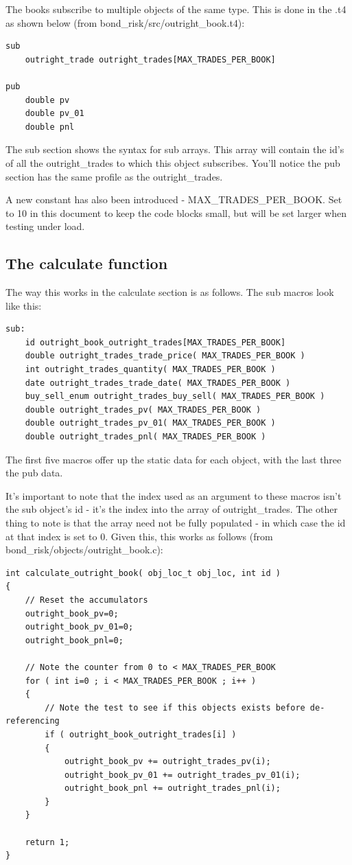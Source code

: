 \documentclass{report}
\begin{document}
The books subscribe to multiple objects of the same type. This is done in the .t4 as shown below (from bond_risk/src/outright_book.t4):

\begin{verbatim}
sub
    outright_trade outright_trades[MAX_TRADES_PER_BOOK]

pub
    double pv
    double pv_01
    double pnl
\end{verbatim}

The sub section shows the syntax for sub arrays. This array will contain the id's of all the outright_trades to which this object subscribes. You'll notice the pub section has the same profile as the outright_trades.

A new constant has also been introduced - MAX_TRADES_PER_BOOK. Set to 10 in this document to keep the code blocks small, but will be set larger when testing under load.

\subsection{The calculate function}

The way this works in the calculate section is as follows. The sub macros look like this:

\begin{verbatim}
sub:
    id outright_book_outright_trades[MAX_TRADES_PER_BOOK]
    double outright_trades_trade_price( MAX_TRADES_PER_BOOK )
    int outright_trades_quantity( MAX_TRADES_PER_BOOK )
    date outright_trades_trade_date( MAX_TRADES_PER_BOOK )
    buy_sell_enum outright_trades_buy_sell( MAX_TRADES_PER_BOOK )
    double outright_trades_pv( MAX_TRADES_PER_BOOK )
    double outright_trades_pv_01( MAX_TRADES_PER_BOOK )
    double outright_trades_pnl( MAX_TRADES_PER_BOOK )
\end{verbatim}

The first five macros offer up the static data for each object, with the last three the pub data.

It's important to note that the index used as an argument to these macros isn't the sub object's id - it's the index into the array of outright_trades. The other thing to note is that the array need not be fully populated - in which case the id at that index is set to 0. Given this, this works as follows (from bond_risk/objects/outright_book.c):

\begin{verbatim}
int calculate_outright_book( obj_loc_t obj_loc, int id )
{
    // Reset the accumulators
    outright_book_pv=0;
    outright_book_pv_01=0;
    outright_book_pnl=0;

    // Note the counter from 0 to < MAX_TRADES_PER_BOOK
    for ( int i=0 ; i < MAX_TRADES_PER_BOOK ; i++ )
    {
        // Note the test to see if this objects exists before de-referencing
        if ( outright_book_outright_trades[i] )
        {
            outright_book_pv += outright_trades_pv(i);
            outright_book_pv_01 += outright_trades_pv_01(i);
            outright_book_pnl += outright_trades_pnl(i);
        }
    }

    return 1;
}
\end{verbatim}
\end{document}
